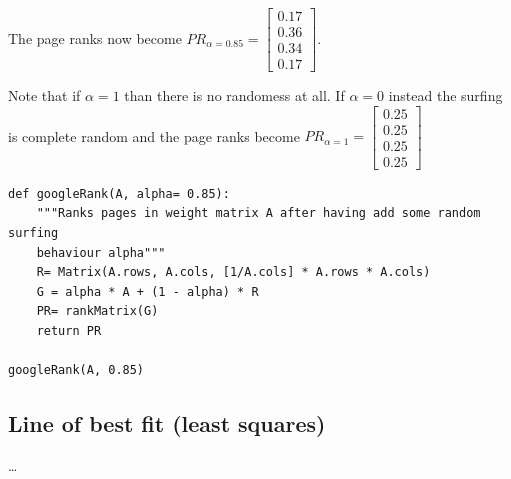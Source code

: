The page ranks now become $PR_{\alpha=0.85} = \left[\begin{matrix}0.17 \\0.36 \\0.34 \\0.17 \end{matrix}\right]$.

Note that if $\alpha = 1$ than there is no randomess at all. If $\alpha = 0$ instead
the surfing is complete random and the page ranks become $PR_{\alpha=1} = \left[\begin{matrix}0.25\\0.25\\0.25\\0.25\end{matrix}\right]$

\begin{verbatim}
def googleRank(A, alpha= 0.85):
    """Ranks pages in weight matrix A after having add some random surfing
    behaviour alpha"""
    R= Matrix(A.rows, A.cols, [1/A.cols] * A.rows * A.cols)
    G = alpha * A + (1 - alpha) * R
    PR= rankMatrix(G)
    return PR

googleRank(A, 0.85)
\end{verbatim}

\subsection{Line of best fit (least squares)}

\dots

